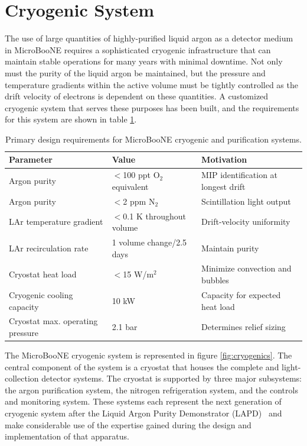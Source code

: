 \section{Cryogenic System}
\label{sec:cryostat}

The use of large quantities of highly-purified liquid argon as a detector medium in MicroBooNE requires a sophisticated cryogenic infrastructure that can maintain stable operations for many years with minimal downtime.  Not only must the purity of the liquid argon be maintained, but the pressure and temperature gradients within the \lartpc active volume must be tightly controlled as the drift velocity of electrons is dependent on these quantities.  A customized cryogenic system that serves these purposes has been built, and the requirements for this system are shown in table \ref{tab:cryoreq}.

\begin{table}[!htb]
   \centering
    \caption{Primary design requirements for MicroBooNE cryogenic and purification systems.} 
    \begin{tabular}{lll} %
    \hline
    Parameter & Value & Motivation\\
    \hline
      Argon purity    & $<$100 ppt O$_2$ equivalent & MIP identification at longest drift\\
      Argon purity    & $<$2 ppm N$_2$ & Scintillation light output\\
      LAr temperature gradient & $<$0.1 K throughout volume & Drift-velocity uniformity\\
      LAr recirculation rate & 1 volume change/2.5 days & Maintain purity\\
      Cryostat heat load & $<$15 W/m$^2$ & Minimize convection and bubbles\\
      Cryogenic cooling capacity & 10 kW & Capacity for expected heat load\\
      Cryostat max. operating pressure & 2.1 bar & Determines relief sizing\\
            \hline
   \end{tabular}
   \label{tab:cryoreq}
\end{table} 

The MicroBooNE cryogenic system is represented in figure \ref{fig:cryogenics}.  The central component of the system is a cryostat that houses the complete \lartpc and light-collection detector systems.  The cryostat is supported by three major subsystems: the argon purification system, the nitrogen refrigeration system, and the controls and monitoring system.  These systems each represent the next generation of \lartpc cryogenic system after the Liquid Argon Purity Demonstrator (LAPD)~\cite{Adamowski:2014-LAPD} and make considerable use of the expertise gained during the design and implementation of that apparatus.  %

